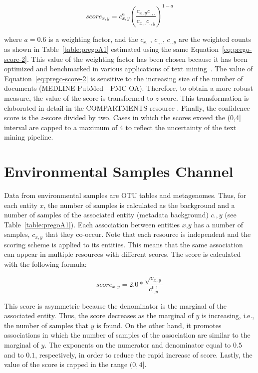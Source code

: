 \begin{equation}
   score_{x,y} = c_{x,y}^a (\frac{c_{x,y} c_{.,.}}{c_{x, .}c_{.,y}})^{1-a}
   \label{eq:prego-score-2}
\end{equation}
   


where $a = 0.6$ is a weighting factor, and the $c_{x,.}$, $c_{.,.}$, 
$c_{.,y}$ are the weighted counts as shown in Table~\ref{table:pregoA1} estimated using the same Equation~\ref{eq:prego-score-2}. 
This value of the weighting factor has been chosen because it has been optimized and benchmarked in various 
applications of text mining~\parencite{franceschini2012string, binder2014compartments, pletscher2015diseases}. 
The value of Equation~\ref{eq:prego-score-2} is sensitive to the increasing size of the number of documents (MEDLINE PubMed—PMC OA).
Therefore, to obtain a more robust measure, the value of the score is transformed to $z$-score. 
This transformation is elaborated in detail in the COMPARTMENTS resource \parencite{binder2014compartments}. 
Finally, the confidence score is the $z$-score divided by two. Cases in which the scores exceed the (0,4] interval are capped to a maximum of 4 to reflect the uncertainty of the text mining pipeline.

\section*{Environmental Samples Channel}

Data from environmental samples are OTU tables and metagenomes. 
Thus, for each entity $x$, the number of samples is calculated as the background 
and a number of samples of the associated entity (metadata background) $c.,y$ (see Table~\ref{table:pregoA1}). 
Each association between entities $x$,$y$ has a number of samples, $c_{x,y}$ that they co-occur. 
Note that each resource is independent and the scoring scheme is applied to its entities. 
This means that the same association can appear in multiple resources with different scores. 
The score is calculated with the following formula:

\begin{equation}
   score_{x,y} = 2.0*{\frac{\sqrt{c_{x,y}}}{c_{.,y}^{0.1}}}
\end{equation}


This score is asymmetric because the denominator is the marginal of the associated entity. 
Thus, the score decreases as the marginal of $y$ is increasing, i.e., the number of samples that $y$ is found. 
On the other hand, it promotes associations in which the number of samples of 
the association are similar to the marginal of $y$. 
The exponents on the numerator and denominator equal to $0.5$ and 
to $0.1$, respectively, in order to reduce the rapid increase of score.
Lastly, the value of the score is capped in the range $(0,4]$.


